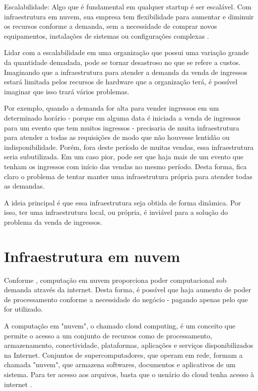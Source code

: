 \begin{citacao}
Escalabilidade: Algo que é fundamental em qualquer startup é ser escalável.
Com infraestrutura em nuvem, sua empresa tem flexibilidade para aumentar e
diminuir os recursos conforme a demanda, sem a necessidade de comprar novos equipamentos,
instalações de sistemas ou configurações complexas
\cite{beneficios-da-computacao-em-nuvem-para-sua-startup}.

\end{citacao}

Lidar com a escalabilidade em uma organização que possui uma variação grande da quantidade
demadada, pode se tornar desastroso no que se refere a custos. Imaginando
que a infraestrutura para atender a demanda da venda de ingressos estará limitada
pelos recursos de hardware que a organização terá, é possível imaginar que isso trará
vários problemas.

Por exemplo, quando a demanda for alta para vender ingressos em um determinado horário -
porque em alguma data é iniciada a venda de ingressos para um evento que tem muitos ingressos
- precisaria de muita infraestrutura para atender a todas as requisições de modo que não houvesse
lentidão ou indisponibilidade. Porém, fora deste período de muitas vendas, essa
infraestrutura seria subutilizada. Em um caso pior, pode ser que haja mais de um evento que
tenham os ingressos com início das vendas no mesmo período. Desta forma, fica claro o problema
de tentar manter uma infraestrutura própria para atender todas as demandas.

A ideia principal é que essa infraestrutura seja obtida de forma dinâmica. Por isso,
ter uma infraestrutura local, ou própria, é inviável para a solução do problema da
venda de ingressos.

\section{Infraestrutura em nuvem}\label{infraestrutura-em-nuvem}

Conforme \cite{what-is-cloud-computing}, computação em nuvem proporciona poder computacional
sob demanda através da internet. Desta forma, é possível que haja aumento de poder
de processamento conforme a necessidade do negócio - pagando apenas pelo que for utilizado.

\begin{citacao}
A computação em "nuvem", o chamado cloud computing, é um conceito que permite o acesso a
um conjunto de recursos como de processamento, armazenamento, conectividade, plataformas,
aplicações e serviços disponibilizados na Internet. Conjuntos de supercomputadores, que operam em
rede, formam a chamada "nuvem", que armazena softwares, documentos e aplicativos de um sistema.
Para ter acesso aos arquivos, basta que o usuário do cloud tenha acesso à internet
\cite{cloud-computing-conceitos-e-perspectivas-2012}.
\end{citacao}

